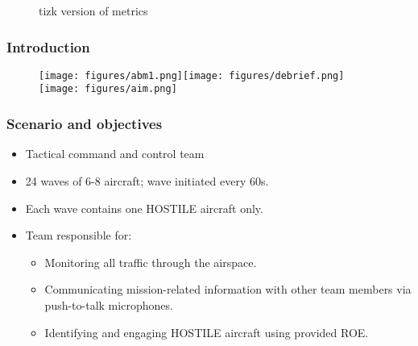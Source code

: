 \documentclass[aspectratio=43, notes]{beamer}
\begin{document}
\begin{frame}
\begin{figure}
	\caption{tizk version of metrics}
	\label{fig:tmetrics}
\end{figure}
\end{frame}



\begin{frame}
\frametitle{Introduction}
\begin{figure}[hb]
	\begin{center}
		\texttt{[image: figures/abm1.png]}\hspace{.2cm}\texttt{[image: figures/debrief.png]}\\
		\vspace{.2cm}
		\texttt{[image: figures/aim.png]}
	\end{center}
	\label{fig:setup} 
\end{figure}
\end{frame}


\begin{frame}
\frametitle{Scenario and objectives}
\begin{itemize}[label=$\bullet$]
	\item Tactical command and control team
	\item 24 waves of 6-8 aircraft; wave initiated every 60s. 
	\item Each wave contains one HOSTILE aircraft only. 
	\item Team responsible for:
	\begin{itemize}[label=$\bullet$]
		\item Monitoring all traffic through the airspace.
	    \item Communicating mission-related information with other team members via push-to-talk microphones. 
		\item Identifying and engaging HOSTILE aircraft using provided ROE.
	\end{itemize}
\end{itemize}
\end{frame}
\end{document}
